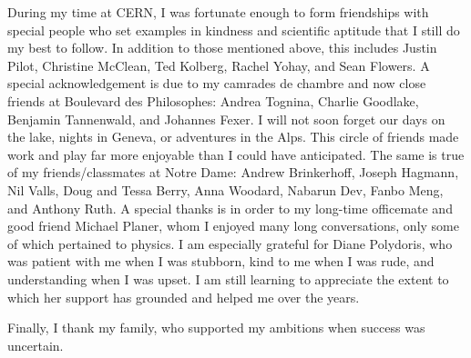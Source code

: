 \documentclass[final,numrefs,sort&compress,noinfo]{nddiss2e}
\begin{document}
\begin{acknowledge}
During my time at CERN, I was fortunate enough to form friendships with special people who set examples
in kindness and scientific aptitude that I still do my best to follow. 
In addition to those mentioned above, this includes Justin Pilot, Christine McClean, Ted Kolberg,
Rachel Yohay, and Sean Flowers.
A special acknowledgement is due to my camrades de chambre and now close friends at Boulevard des Philosophes:
Andrea Tognina, Charlie Goodlake, Benjamin Tannenwald, and Johannes Fexer.
I will not soon forget our days on the lake, nights in Geneva, or adventures in the Alps.  
This circle of friends made work and play far more enjoyable
than I could have anticipated.
The same is true of my friends/classmates at Notre Dame:
Andrew Brinkerhoff, Joseph Hagmann, Nil Valls, Doug and Tessa Berry,
Anna Woodard, Nabarun Dev, Fanbo Meng, and Anthony Ruth. A special thanks is in order to my long-time officemate and
good friend Michael Planer, whom I enjoyed many long conversations, only some of which pertained to physics. 
I am especially grateful for Diane Polydoris, who was patient with me when I was stubborn, kind to me when I was rude,
and understanding when I was upset. I am still learning to appreciate the extent to which her support has grounded and helped me
over the years.

Finally, I thank my family, who supported my ambitions when success was uncertain.

\end{acknowledge}

\mainmatter


\backmatter              %

\end{document}
